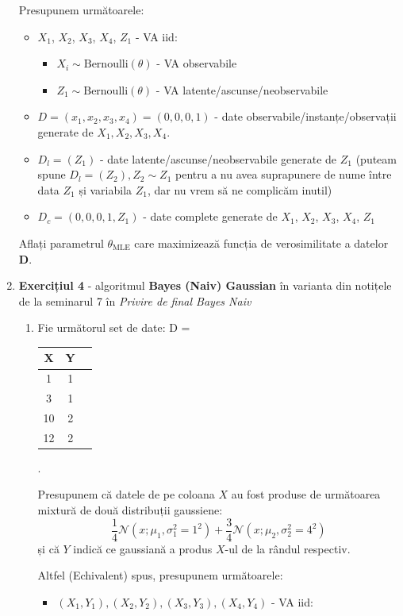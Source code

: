 \documentclass[12pt]{article}
\begin{document}
\begin{enumerate}
		Presupunem următoarele:
		\begin{itemize}
			\item $X_1$, $X_2$, $X_3$, $X_4$, $Z_1$ - VA iid: 
			\begin{itemize}
				\item $X_i \sim \text{Bernoulli}(\theta)$ - VA observabile
				\item $Z_1 \sim \text{Bernoulli}(\theta)$ - VA latente/ascunse/neobservabile
			\end{itemize}
			\item $D=(x_1,x_2,x_3,x_4) = (0,0,0,1)$ - date observabile/instanțe/observații generate de $X_1,X_2,X_3,X_4$.
			\item $D_l = (Z_1)$ - date latente/ascunse/neobservabile generate de $Z_1$ (puteam spune $D_l = (Z_2), Z_2\sim Z_1$ pentru a nu avea suprapunere de nume între data $Z_1$ și variabila $Z_1$, dar nu vrem să ne complicăm inutil)
			\item $D_c = (0,0,0,1,Z_1)$ - date complete generate de $X_1$, $X_2$, $X_3$, $X_4$, $Z_1$
		\end{itemize}
		Aflați parametrul $\theta_\text{MLE}$ care maximizează funcția de verosimilitate a datelor \textbf{D}.
		\item \textbf{Exercițiul 4} - algoritmul \textbf{Bayes (Naiv) Gaussian} în varianta din notițele de la seminarul 7 în \textit{Privire de final Bayes Naiv}
		
		\begin{enumerate}
			\item Fie următorul set de date: D =
			\begin{tabular}{ |c|c|c| } 
				\hline
				X & Y \\ 
				\hline
				1 & 1 \\ 
				3 & 1\\ 
				10 & 2\\
				12 & 2\\
				\hline
			\end{tabular}. 
			
			Presupunem că datele de pe coloana $X$ au fost produse de următoarea mixtură de două distribuții gaussiene:
			$$\dfrac{1}{4}\mathcal{N}(x;\mu_1,\sigma_1^2=1^2) + \dfrac{3}{4}\mathcal{N}(x;\mu_2,\sigma_2^2=4^2)$$
			și că $Y$ indică ce gaussiană a produs $X$-ul de la rândul respectiv.
			
			Altfel (Echivalent) spus, presupunem următoarele:
			\begin{itemize}
				\item $(X_1,Y_1), (X_2,Y_2), (X_3,Y_3), (X_4,Y_4)$ - VA iid: 
				

\end{itemize}
\end{enumerate}
\end{enumerate}
\end{document}
